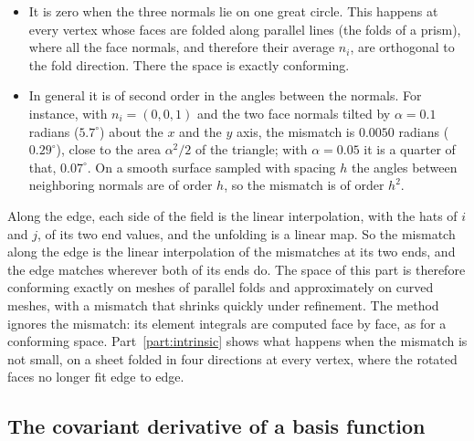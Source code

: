 \begin{itemize}
\item It is zero when the three normals lie on one great circle. This happens at every vertex whose faces are folded along parallel lines (the folds of a prism), where all the face normals, and therefore their average $n_i$, are orthogonal to the fold direction. There the space is exactly conforming.
\item In general it is of second order in the angles between the normals. For instance, with $n_i = (0, 0, 1)$ and the two face normals tilted by $\alpha = 0.1$ radians ($5.7^\circ$) about the $x$ and the $y$ axis, the mismatch is $0.0050$ radians ($0.29^\circ$), close to the area $\alpha^2/2$ of the triangle; with $\alpha = 0.05$ it is a quarter of that, $0.07^\circ$. On a smooth surface sampled with spacing $h$ the angles between neighboring normals are of order $h$, so the mismatch is of order $h^2$.
\end{itemize}
Along the edge, each side of the field is the linear interpolation, with the hats of $i$ and $j$, of its two end values, and the unfolding is a linear map. So the mismatch along the edge is the linear interpolation of the mismatches at its two ends, and the edge matches wherever both of its ends do. The space of this part is therefore conforming exactly on meshes of parallel folds and approximately on curved meshes, with a mismatch that shrinks quickly under refinement. The method ignores the mismatch: its element integrals are computed face by face, as for a conforming space. Part~\ref{part:intrinsic} shows what happens when the mismatch is not small, on a sheet folded in four directions at every vertex, where the rotated faces no longer fit edge to edge.

\subsection{The covariant derivative of a basis function}
\label{section:r1_basis_derivative}

